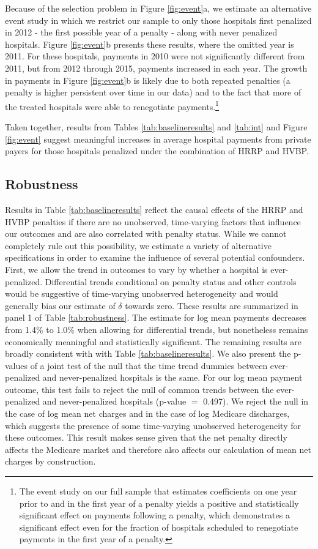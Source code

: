 \documentclass[12pt]{article}
\begin{document}
Because of the selection problem in Figure \ref{fig:event}a, we estimate an alternative event study in which we restrict our sample to only those hospitals first penalized in 2012 - the first possible year of a penalty - along with never penalized hospitals.  Figure \ref{fig:event}b presents these results, where the omitted year is 2011.  For these hospitals, payments in 2010 were not significantly different from 2011, but from 2012 through 2015, payments increased in each year.  The growth in payments in Figure \ref{fig:event}b is likely due to both repeated penalties (a penalty is higher persistent over time in our data) and to the fact that more of the treated hospitals were able to renegotiate payments.\footnote{The event study on our full sample that estimates coefficients on one year prior to and in the first year of a penalty yields a positive and statistically significant effect on payments following a penalty, which demonstrates a significant effect even for the fraction of hospitals scheduled to renegotiate payments in the first year of a penalty.}

Taken together, results from Tables \ref{tab:baselineresults} and \ref{tab:int} and Figure \ref{fig:event} suggest meaningful increases in average hospital payments from private payers for those hospitals penalized under the combination of HRRP and HVBP.


\subsection{Robustness}
Results in Table \ref{tab:baselineresults} reflect the causal effects of the HRRP and HVBP penalties if there are no unobserved, time-varying factors that influence our outcomes and are also correlated with penalty status.  While we cannot completely rule out this possibility, we estimate a variety of alternative specifications in order to examine the influence of several potential confounders.  First, we allow the trend in outcomes to vary by whether a hospital is ever-penalized. Differential trends conditional on penalty status and other controls would be suggestive of time-varying unobserved heterogeneity and would generally bias our estimate of $\delta$ towards zero.  These results are summarized in panel 1 of Table \ref{tab:robustness}. The estimate for log mean payments decreases from 1.4\% to 1.0\% when allowing for differential trends, but nonetheless remains economically meaningful and statistically significant. The remaining results are broadly consistent with with Table \ref{tab:baselineresults}. We also present the p-values of a joint test of the null that the time trend dummies between ever-penalized and never-penalized hospitals is the same. For our log mean payment outcome, this test fails to reject the null of common trends between the ever-penalized and never-penalized hospitals (p-value $=$ 0.497). We reject the null in the case of log mean net charges and in the case of log Medicare discharges, which suggests the presence of some time-varying unobserved heterogeneity for these outcomes. This result makes sense given that the net penalty directly affects the Medicare market and therefore also affects our calculation of mean net charges by construction.
\end{document}
